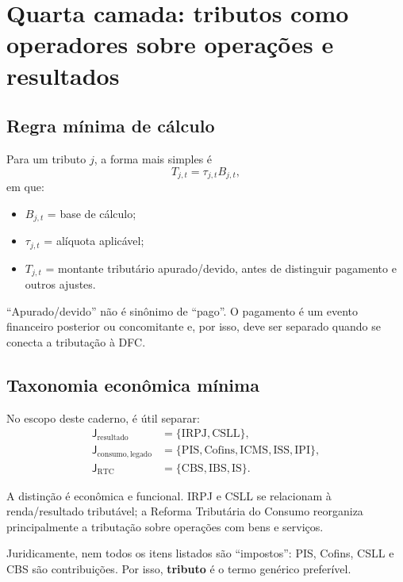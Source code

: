 \documentclass[11pt,a4paper]{article}
\newcommand{\CBS}{\mathrm{CBS}}
\newcommand{\IBS}{\mathrm{IBS}}
\newcommand{\IRPJ}{\mathrm{IRPJ}}
\newcommand{\CSLL}{\mathrm{CSLL}}
\newcommand{\ICMS}{\mathrm{ICMS}}
\newcommand{\ISS}{\mathrm{ISS}}
\newcommand{\IPI}{\mathrm{IPI}}
\newcommand{\PIS}{\mathrm{PIS}}
\newcommand{\COFINS}{\mathrm{Cofins}}
\newcommand{\IS}{\mathrm{IS}}
\begin{document}
\section{Quarta camada: tributos como operadores sobre operações e resultados}

\subsection{Regra mínima de cálculo}

Para um tributo $j$, a forma mais simples é
\begin{equation}
\boxed{T_{j,t}=\tau_{j,t}B_{j,t},}
\label{eq:tax-basic}
\end{equation}
em que:
\begin{itemize}
    \item $B_{j,t}$ = base de cálculo;
    \item $\tau_{j,t}$ = alíquota aplicável;
    \item $T_{j,t}$ = montante tributário apurado/devido, antes de distinguir pagamento e outros ajustes.
\end{itemize}

\begin{cuidado}
``Apurado/devido'' não é sinônimo de ``pago''. O pagamento é um evento financeiro posterior ou concomitante e, por isso, deve ser separado quando se conecta a tributação à DFC.
\end{cuidado}

\subsection{Taxonomia econômica mínima}

No escopo deste caderno, é útil separar:
\begin{align}
\mathsf J_{\mathrm{resultado}}&=\{\IRPJ,\CSLL\},\\
\mathsf J_{\mathrm{consumo,legado}}&=\{\PIS,\COFINS,\ICMS,\ISS,\IPI\},\\
\mathsf J_{\mathrm{RTC}}&=\{\CBS,\IBS,\IS\}.
\end{align}

A distinção é econômica e funcional. IRPJ e CSLL se relacionam à renda/resultado tributável; a Reforma Tributária do Consumo reorganiza principalmente a tributação sobre operações com bens e serviços.

Juridicamente, nem todos os itens listados são ``impostos'': PIS, Cofins, CSLL e CBS são contribuições. Por isso, \textbf{tributo} é o termo genérico preferível.
\end{document}
